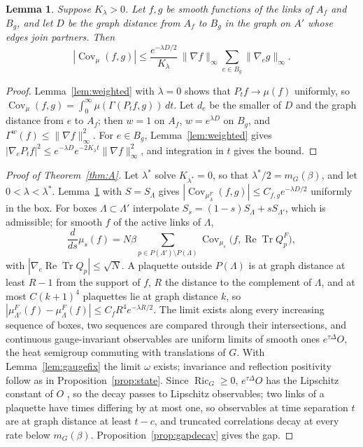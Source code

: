 \documentclass[11pt]{amsart}
\newtheorem{lemma}[theorem]{Lemma}
\theoremstyle{definition}
\theoremstyle{remark}
\numberwithin{equation}{section}
\newcommand{\ReTr}{\operatorname{Re}\operatorname{Tr}}
\newcommand{\Ric}{\operatorname{Ric}}
\newcommand{\Cov}{\operatorname{Cov}}
\begin{document}
\begin{lemma}\label{lem:decayrate}
Suppose $K_\lambda>0$. Let $f,g$ be smooth functions of the links of $A_f$ and
$B_g$, and let $D$ be the graph distance from $A_f$ to $B_g$ in the graph on
$A'$ whose edges join partners. Then
\[
|\Cov_\mu(f,g)|\le\frac{e^{-\lambda D/2}}{K_\lambda}\,\|\nabla f\|_\infty
\sum_{e\in B_g}\|\nabla_eg\|_\infty .
\]
\end{lemma}

\begin{proof}
Lemma~\ref{lem:weighted} with $\lambda=0$ shows that $P_tf\to\mu(f)$ uniformly,
so $\Cov_\mu(f,g)=\int_0^\infty\mu(\Gamma(P_tf,g))\,dt$. Let $d_e$ be the smaller of
$D$ and the graph distance from $e$ to $A_f$; then $w=1$ on $A_f$, $w=e^{\lambda
D}$ on $B_g$, and $\Gamma^w(f)\le\|\nabla f\|_\infty^2$. For $e\in B_g$,
Lemma~\ref{lem:weighted} gives $|\nabla_eP_tf|^2\le e^{-\lambda D}e^{-2K_\lambda t}
\|\nabla f\|_\infty^2$, and integration in $t$ gives the bound.
\end{proof}

\begin{proof}[Proof of Theorem~\ref{thm:A}]
Let $\lambda^*$ solve $K_{\lambda^*}=0$, so that $\lambda^*/2=m_G(\beta)$, and let
$0<\lambda<\lambda^*$. Lemma~\ref{lem:decayrate} with $S=S_\Lambda$ gives
$|\Cov_{\mu^F_\Lambda}(f,g)|\le C_{f,g}e^{-\lambda D/2}$ uniformly in the box. For
boxes $\Lambda\subset\Lambda'$ interpolate $S_s=(1-s)S_\Lambda+sS_{\Lambda'}$, which is
admissible; for smooth $f$ of the active links of $\Lambda$,
\[
\frac d{ds}\mu_s(f)=N\beta\sum_{p\in P(\Lambda')\setminus P(\Lambda)}\Cov_{\mu_s}
\bigl(f,\ReTr Q^F_p\bigr),
\]
with $|\nabla_e\ReTr Q_p|\le\sqrt N$. A plaquette outside $P(\Lambda)$ is at graph
distance at least $R-1$ from the support of $f$, $R$ the distance to the
complement of $\Lambda$, and at most $C(k+1)^4$ plaquettes lie at graph distance
$k$, so $|\mu^F_{\Lambda'}(f)-\mu^F_\Lambda(f)|\le C_fR^4e^{-\lambda R/2}$. The limit
exists along every increasing sequence of boxes, two sequences are compared
through their intersections, and continuous gauge-invariant observables are
uniform limits of smooth ones $e^{\tau\Delta}O$, the heat semigroup commuting
with translations of $G$. With Lemma~\ref{lem:gaugefix} the limit $\omega$ exists;
invariance and reflection positivity follow as in Proposition~\ref{prop:state}.
Since $\Ric_G\ge0$, $e^{\tau\Delta}O$ has the Lipschitz constant of $O$
\cite[Sect.~3.3]{BGL14}, so the decay passes to Lipschitz observables; two links
of a plaquette have times differing by at most one, so observables at time
separation $t$ are at graph distance at least $t-c$, and truncated
correlations decay at every rate below $m_G(\beta)$. Proposition~\ref{prop:gapdecay}
gives the gap.
\end{proof}
\end{document}
